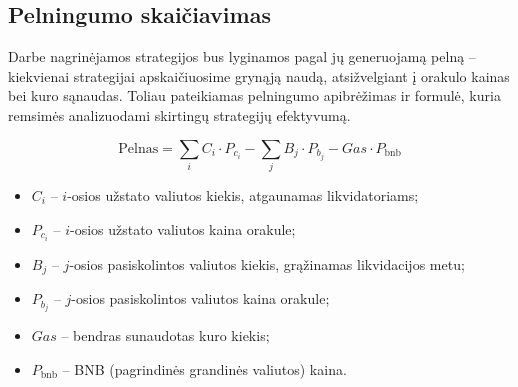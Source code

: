 \documentclass[]{VUMIFTemplateClass}
\begin{document}

\subsection{Pelningumo skaičiavimas}

Darbe nagrinėjamos strategijos bus lyginamos pagal jų generuojamą pelną – kiekvienai strategijai apskaičiuosime grynąją naudą, atsižvelgiant į orakulo kainas bei kuro sąnaudas. Toliau pateikiamas pelningumo apibrėžimas ir formulė, kuria remsimės analizuodami skirtingų strategijų efektyvumą.

\[
\text{Pelnas} = \sum_{i} C_i \cdot P_{c_i} - \sum_{j} B_j \cdot P_{b_j} - Gas \cdot P_\text{bnb}
\]

\begin{itemize}
    \item $C_i$ – $i$-osios užstato valiutos kiekis, atgaunamas likvidatoriams;
    \item $P_{c_i}$ – $i$-osios užstato valiutos kaina orakule;
    \item $B_j$ – $j$-osios pasiskolintos valiutos kiekis, grąžinamas likvidacijos metu;
    \item $P_{b_j}$ – $j$-osios pasiskolintos valiutos kaina orakule;
    \item $Gas$ – bendras sunaudotas kuro kiekis;
    \item $P_\text{bnb}$ – BNB (pagrindinės grandinės valiutos) kaina.
\end{itemize}
\end{document}
